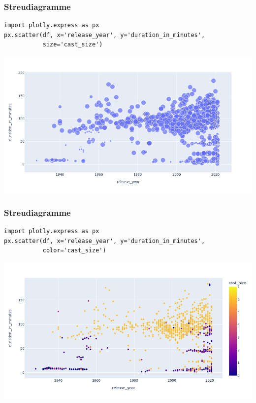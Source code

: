 \begin{frame}[fragile]
\frametitle{Streudiagramme}

\begin{verbatim}
import plotly.express as px
px.scatter(df, x='release_year', y='duration_in_minutes',
           size='cast_size')
\end{verbatim}

\vspace{-\baselineskip}

\begin{center}
\includegraphics[width=0.80\linewidth]{fig5/scatter2.png}
\end{center}
\end{frame}


\begin{frame}[fragile]
\frametitle{Streudiagramme}

\begin{verbatim}
import plotly.express as px
px.scatter(df, x='release_year', y='duration_in_minutes',
           color='cast_size')
\end{verbatim}

\vspace{-\baselineskip}

\begin{center}
\includegraphics[width=0.80\linewidth]{fig5/scatter3.png}
\end{center}
\end{frame}


